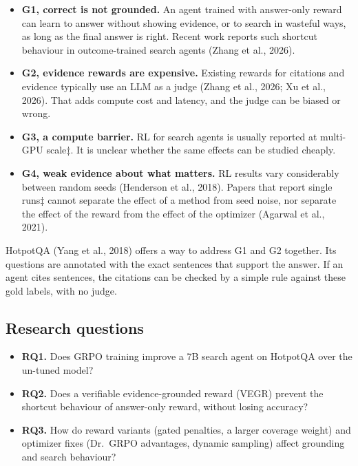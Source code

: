 \begin{itemize}
\tightlist
\item
  \textbf{G1, correct is not grounded.} An agent trained with
  answer-only reward can learn to answer without showing evidence, or to
  search in wasteful ways, as long as the final answer is right. Recent
  work reports such shortcut behaviour in outcome-trained search agents
  (Zhang et al., 2026).
\item
  \textbf{G2, evidence rewards are expensive.} Existing rewards for
  citations and evidence typically use an LLM as a judge (Zhang et al.,
  2026; Xu et al., 2026). That adds compute cost and latency, and the
  judge can be biased or wrong.
\item
  \textbf{G3, a compute barrier.} RL for search agents is usually
  reported at multi-GPU scale‡. It is unclear whether the same effects
  can be studied cheaply.
\item
  \textbf{G4, weak evidence about what matters.} RL results vary
  considerably between random seeds (Henderson et al., 2018). Papers
  that report single runs‡ cannot separate the effect of a method from
  seed noise, nor separate the effect of the reward from the effect of
  the optimizer (Agarwal et al., 2021).
\end{itemize}

HotpotQA (Yang et al., 2018) offers a way to address G1 and G2 together.
Its questions are annotated with the exact sentences that support the
answer. If an agent cites sentences, the citations can be checked by a
simple rule against these gold labels, with no judge.

\subsection{Research questions}\label{sec:1.3}

\begin{itemize}
\tightlist
\item
  \textbf{RQ1.} Does GRPO training improve a 7B search agent on HotpotQA
  over the un-tuned model?
\item
  \textbf{RQ2.} Does a verifiable evidence-grounded reward (VEGR)
  prevent the shortcut behaviour of answer-only reward, without losing
  accuracy?
\item
  \textbf{RQ3.} How do reward variants (gated penalties, a larger
  coverage weight) and optimizer fixes (Dr.~GRPO advantages, dynamic
  sampling) affect grounding and search behaviour?
\end{itemize}

